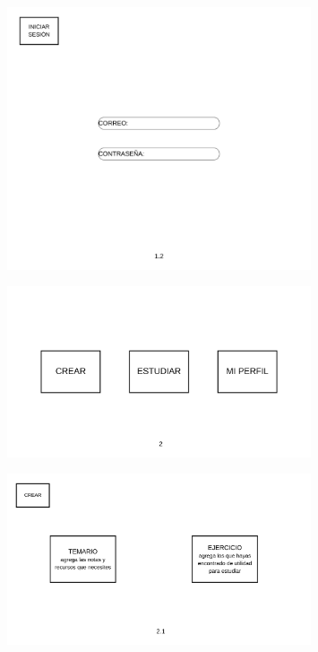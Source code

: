 \documentclass{report}
\begin{document}
\begin{figure}[H]
    \centering
    \includegraphics[width=0.8\textwidth]{./Diagramas/3.png}
\end{figure}

\begin{figure}[H]
    \centering
    \includegraphics[width=0.8\textwidth]{./Diagramas/4.png}
\end{figure}

\begin{figure}[H]
    \centering
    \includegraphics[width=0.8\textwidth]{./Diagramas/5.png}
\end{figure}
\end{document}
